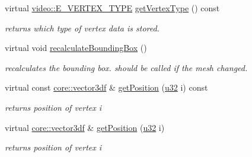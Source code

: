\begin{DoxyCompactItemize}
\mbox{\label{structirr_1_1scene_1_1SSharedMeshBuffer_af6e2e8a103a2c0713d5a090d92a4edb6}} 
virtual \hyperlink{namespaceirr_1_1video_a0e3b59e025e0d0db0ed2ee0ce904deac}{video\+::\+E\+\_\+\+V\+E\+R\+T\+E\+X\+\_\+\+T\+Y\+PE} \hyperlink{structirr_1_1scene_1_1SSharedMeshBuffer_af6e2e8a103a2c0713d5a090d92a4edb6}{get\+Vertex\+Type} () const
\begin{DoxyCompactList}\small\item\em returns which type of vertex data is stored. \end{DoxyCompactList}\item 
\mbox{\label{structirr_1_1scene_1_1SSharedMeshBuffer_a1425de91a910751d0e7fc8b8dca636e9}} 
virtual void \hyperlink{structirr_1_1scene_1_1SSharedMeshBuffer_a1425de91a910751d0e7fc8b8dca636e9}{recalculate\+Bounding\+Box} ()
\begin{DoxyCompactList}\small\item\em recalculates the bounding box. should be called if the mesh changed. \end{DoxyCompactList}\item 
\mbox{\label{structirr_1_1scene_1_1SSharedMeshBuffer_ad0b4d04e67c39d2dab9900bdfce6b474}} 
virtual const \hyperlink{namespaceirr_1_1core_a06f169d08b5c429f5575acb7edbad811}{core\+::vector3df} \& \hyperlink{structirr_1_1scene_1_1SSharedMeshBuffer_ad0b4d04e67c39d2dab9900bdfce6b474}{get\+Position} (\hyperlink{namespaceirr_a0416a53257075833e7002efd0a18e804}{u32} i) const
\begin{DoxyCompactList}\small\item\em returns position of vertex i \end{DoxyCompactList}\item 
\mbox{\label{structirr_1_1scene_1_1SSharedMeshBuffer_a3a9d00d4a52471083a21ed18a8ce7729}} 
virtual \hyperlink{namespaceirr_1_1core_a06f169d08b5c429f5575acb7edbad811}{core\+::vector3df} \& \hyperlink{structirr_1_1scene_1_1SSharedMeshBuffer_a3a9d00d4a52471083a21ed18a8ce7729}{get\+Position} (\hyperlink{namespaceirr_a0416a53257075833e7002efd0a18e804}{u32} i)
\begin{DoxyCompactList}\small\item\em returns position of vertex i \end{DoxyCompactList}\item 

\end{DoxyCompactItemize}
